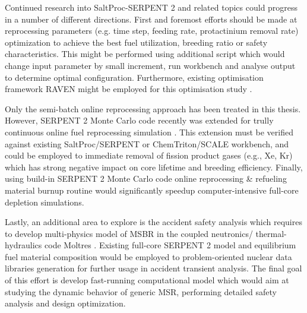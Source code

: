 Continued research into SaltProc-SERPENT 2 and related topics could progress in a number of different directions. First and foremost efforts should be made at reprocessing parameters (e.g. time step, feeding rate, protactinium removal
rate) optimization to achieve the best fuel utilization, breeding ratio or safety characteristics. This might be performed using additional script which would change input parameter by small increment, run workbench and analyse output to determine optimal configuration. Furthermore, existing optimisation framework RAVEN might be employed for this optimisation study \cite{alfonsi_raven_2013}.

Only the semi-batch online reprocessing approach has been treated in this thesis. However, SERPENT 2 Monte Carlo code recently was extended for trully continuous online fuel reprocessing simulation \cite{aufiero_extended_2013}. This extension must be verified against existing SaltProc/SERPENT or ChemTriton/SCALE workbench, and could be employed to immediate removal of fission product gases (e.g., Xe, Kr) which has strong negative impact on core lifetime and breeding efficiency. Finally, using build-in SERPENT 2 Monte Carlo code online reprocessing \& refueling material burnup routine would significantly speedup computer-intensive full-core depletion simulations.

Lastly, an additional area to explore is the accident safety analysis which requires to develop multi-physics model of \gls{MSBR} in the coupled neutronics/ thermal-hydraulics code Moltres \cite{lindsay_introduction_2018}. Existing full-core SERPENT 2 model and equilibrium fuel material composition would be employed to problem-oriented nuclear data libraries generation for further usage in accident transient analysis. The final goal of this effort is develop fast-running computational model which would aim at studying the dynamic behavior of generic \gls{MSR}, performing detailed safety analysis and design optimization.

